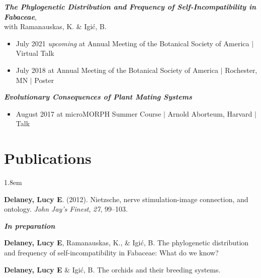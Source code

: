 \documentclass[]{article}
\newlength{\cslhangindent}
\newenvironment{cslreferences}
{\setlength{\parindent}{0pt}
\everypar{\setlength{\hangindent}{\cslhangindent}}\ignorespaces}
{\par}
\begin{document}
\textit{\textbf{The Phylogenetic Distribution and Frequency of Self-Incompatibility in Fabaceae}},\\ with Ramanauskas, K. \& Igić, B.

\begin{itemize}[label=$\mathwitch*$]
\item{July 2021 \textit{upcoming} at Annual Meeting of the Botanical Society of America $\vert$ Virtual Talk}
\item{July 2018 at Annual Meeting of the Botanical Society of America $\vert$ Rochester, MN $\vert$ Poster \hspace{0.3mm} \href{https://ledelaney.org/static/posters/poster.png}{\faFileImage}}
\end{itemize}
\vspace{2mm}

\textit{\textbf{Evolutionary Consequences of Plant Mating Systems}}

\begin{itemize}[label=$\mathwitch*$]
\item{August 2017 at microMORPH Summer Course $\vert$ Arnold Aborteum, Harvard $\vert$ Talk \hspace{0.3mm} \href{https://www.dropbox.com/s/o7hcg5riw97wf9i/08-2017-microMORPH.pdf?dl=1}{\faImages}}
\end{itemize}
\vspace{6mm}

\section{Publications}

\vspace{2mm}
\leftskip 1.8em

\begin{cslreferences}
\textbf{Delaney, Lucy E}. (2012). Nietzsche, nerve stimulation-image connection, and ontology. \emph{John Jay's Finest}, \emph{27}, 99--103. \href{https://ledelaney.org/static/docs/Delaney-JJAYFinest.pdf}{\faFile}\\
\end{cslreferences}

\textbf{\textit{In preparation}}
\vspace{2mm}

\begin{cslreferences}
\textbf{Delaney, Lucy E}, Ramanauskas, K., \& Igić, B. The phylogenetic distribution and frequency of self-incompatibility in Fabaceae: What do we know?

\textbf{Delaney, Lucy E} \& Igić, B. The orchids and their breeding systems.\\
\end{cslreferences}
\vspace{2mm}
\end{document}
